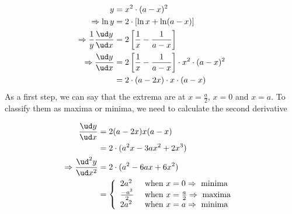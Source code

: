\begin{solution}[\fullpage]
  \begin{align}
     y &= x^2\cdot(a-x)^2 \\
     \Rightarrow \ln y &= 2\cdot \left[\ln x + \ln (a-x)\right] \\
     \Rightarrow \dfrac{1}{y}\dfrac{\ud y}{\ud x} &= 2\left[ \dfrac{1}{x} - \dfrac{1}{a-x}\right] \\
     \Rightarrow \dfrac{\ud y}{\ud x} &= 2\left[ \dfrac{1}{x} - \dfrac{1}{a-x}\right]
                                         \cdot x^2\cdot (a-x)^2 \\
                                      &= 2\cdot(a-2x)\cdot x \cdot (a-x)
  \end{align}
  As a first step, we can say that the extrema are at $x=\frac{a}{2}$, $x=0$ and $x=a$.
  To classify them as maxima or minima, we need to calculate the second derivative
  
  \begin{align}
     \dfrac{\ud y}{\ud x} &= 2(a-2x)x(a-x) \\
            &= 2\cdot(a^2x - 3ax^2 + 2x^3) \\
     \Rightarrow \dfrac{\ud^2 y}{\ud x^2} &= 2\cdot(a^2 - 6ax + 6x^2) \\
     &= \left\lbrace
        \begin{array}{l l}
          2a^2 & \text{ when } x = 0 \Rightarrow \text{ minima } \\
          \frac{-a^2}{2} & \text{ when } x = \frac{a}{2} \Rightarrow \text{ maxima } \\
          2a^2 & \text{ when } x = a \Rightarrow \text{ minima }
        \end{array}\right.
  \end{align}
  
\end{solution}
